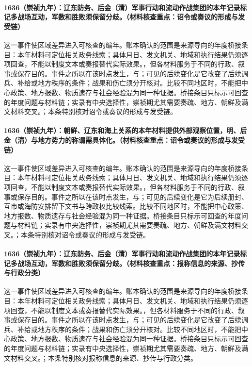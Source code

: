\paragraph{1636（崇祯九年）：辽东防务、后金（清）军事行动和流动作战集团的本年记录标记多战场互动，军数和胜败须保留分歧。（材料核查重点：诏令或奏议的形成与发受链）} 这一事件使区域差异进入可核查的编年。账本确认的范围是来源导向的年度桥接条目：本年材料可定位相关政务线索；具体月日、发文机关、地域和执行结果仍须逐项回查，不能以制度文本或奏报替代实际效果。，但各材料服务于不同的行政、叙事或保存目的。事件之所以在该时点发生，与；可见的后续变化是它改变了后续调兵、补给或地方秩序的条件；战果和伤亡须分开核对。比较不同地区时，不能把中心政策、地方报数、物质遗存与社会经验混为同一种证据。桥接条目只标示可回查的年度问题与材料链；实录有中央选择性，崇祯期尤其需要奏疏、地方、朝鲜及满文材料交叉。；本条特别核对诏令或奏议的形成与发受链。

\paragraph{1636（崇祯九年）：朝鲜、辽东和海上关系的本年材料提供外部观察位置，明、后金（清）与地方势力的称谓需具体化。（材料核查重点：诏令或奏议的形成与发受链）} 这一事件使区域差异进入可核查的编年。账本确认的范围是来源导向的年度桥接条目：本年材料可定位相关政务线索；具体月日、发文机关、地域和执行结果仍须逐项回查，不能以制度文本或奏报替代实际效果。，但各材料服务于不同的行政、叙事或保存目的。事件之所以在该时点发生，与；可见的后续变化是它为后续册封、互市或海防安排留下文书与跨政权比较线索。比较不同地区时，不能把中心政策、地方报数、物质遗存与社会经验混为同一种证据。桥接条目只标示可回查的年度问题与材料链；实录有中央选择性，崇祯期尤其需要奏疏、地方、朝鲜及满文材料交叉。；本条特别核对诏令或奏议的形成与发受链。

\paragraph{1636（崇祯九年）：辽东防务、后金（清）军事行动和流动作战集团的本年记录标记多战场互动，军数和胜败须保留分歧。（材料核查重点：报称信息的来源、抄传与行政分类）} 这一事件使区域差异进入可核查的编年。账本确认的范围是来源导向的年度桥接条目：本年材料可定位相关政务线索；具体月日、发文机关、地域和执行结果仍须逐项回查，不能以制度文本或奏报替代实际效果。，但各材料服务于不同的行政、叙事或保存目的。事件之所以在该时点发生，与；可见的后续变化是它改变了后续调兵、补给或地方秩序的条件；战果和伤亡须分开核对。比较不同地区时，不能把中心政策、地方报数、物质遗存与社会经验混为同一种证据。桥接条目只标示可回查的年度问题与材料链；实录有中央选择性，崇祯期尤其需要奏疏、地方、朝鲜及满文材料交叉。；本条特别核对报称信息的来源、抄传与行政分类。

